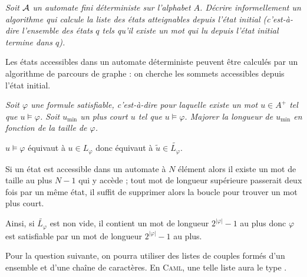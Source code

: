 \begin{Exercise}\it
Soit $\cal A$ un automate fini déterministe sur l'alphabet $A$. Décrire informellement un algorithme qui calcule la liste des états atteignables depuis l'état initial (c'est-à-dire l'ensemble des états $q$ tels qu'il existe un mot qui lu depuis l'état initial termine dans $q$).
\end{Exercise}
\begin{Answer}
Les états accessibles dans un automate déterministe peuvent être calculés par un algorithme de parcours de graphe : on cherche les sommets accessibles depuis l'état initial.
\end{Answer}
\begin{Exercise}\it
Soit $\varphi$ une formule satisfiable, c'est-à-dire pour laquelle existe un mot $u\in A^+$ tel que $u\vDash \varphi$. Soit $u_{\text{min}}$ un plus court $u$ tel que $u\vDash \varphi$. Majorer la longueur de $u_\text{min}$ en fonction de la taille de $\varphi$.
\end{Exercise}
\begin{Answer}
$u \vDash \varphi$ équivaut à $u\in L_\varphi$ donc équivaut à $\widetilde u \in \widetilde{L_\varphi}$.

Si un état est accessible dans un automate à $N$ élément alors il existe un mot de taille au plus $N-1$ qui y accède ; tout mot de longueur supérieure passerait deux fois par un même état, il suffit de supprimer alors la boucle pour trouver un mot plus court.

Ainsi, si $\widetilde{L_\varphi}$ est non vide, il contient un mot de longueur $2^{|\varphi|}-1$ au plus donc $\varphi$ est satisfiable par un mot de longueur $2^{|\varphi|}-1$ au plus.
\end{Answer}

\medskip

Pour la question suivante, on pourra utiliser des listes de couples formés d'un ensemble et d'une chaîne de caractères. En \textsc{Caml}, une telle liste aura le type .

